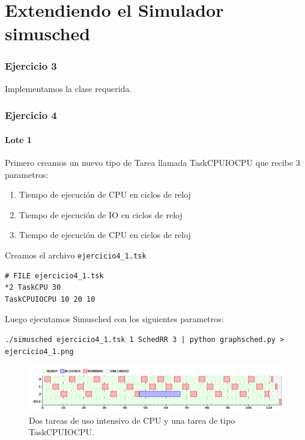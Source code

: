 


\part{Extendiendo el Simulador simusched}

\section{Ejercicio 3}

Implementamos la clase requerida.

\section{Ejercicio 4}

\subsection{Lote 1}

Primero creamos un nuevo tipo de Tarea llamada TaskCPUIOCPU que recibe 3 parametros:
\begin{enumerate}
 \item Tiempo de ejecución de CPU en ciclos de reloj
 \item Tiempo de ejecución de IO en ciclos de reloj
 \item Tiempo de ejecución de CPU en ciclos de reloj
\end{enumerate}

Creamos el archivo \verb|ejercicio4_1.tsk|

\begin{framed}
\begin{verbatim}
# FILE ejercicio4_1.tsk
*2 TaskCPU 30
TaskCPUIOCPU 10 20 10
\end{verbatim}
\end{framed}

Luego ejecutamos Simusched con los siguientes parametros:

\begin{framed}
\begin{verbatim}
./simusched ejercicio4_1.tsk 1 SchedRR 3 | python graphsched.py > ejercicio4_1.png
\end{verbatim}
\end{framed}

\begin{figure}[h!]
  \caption{Dos tareas de uso intensivo de CPU y una tarea de tipo TaskCPUIOCPU.}
  \centering
    \includegraphics[width=1\textwidth]{img/ejercicio4_1.png}
\end{figure}

